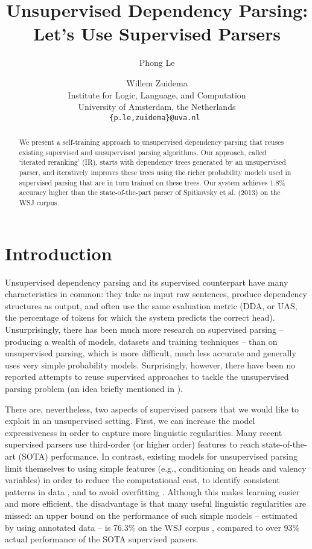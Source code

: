 \documentclass[11pt,letterpaper]{article}
\title{Unsupervised Dependency Parsing: Let's Use Supervised Parsers}
\author{Phong Le \and Willem Zuidema\\
Institute for Logic, Language, and Computation \\
University of Amsterdam, the Netherlands\\
{\tt \{p.le,zuidema\}@uva.nl } \\ }
\begin{document}
\maketitle

\begin{abstract}

  We present a self-training approach to unsupervised dependency parsing that
  reuses existing supervised and unsupervised parsing algorithms. Our
  approach, called `iterated reranking' (IR), starts
  with dependency trees generated by an unsupervised parser, and
  iteratively improves these trees using the richer probability models
  used in supervised parsing that are in turn trained on these trees. 
  Our system achieves 1.8\%
  accuracy higher than the state-of-the-part parser of Spitkovsky et
  al. (2013) on the WSJ corpus.

\end{abstract}


\section{Introduction}

Unsupervised dependency parsing and its supervised counterpart have
many characteristics in common: they take as input raw sentences,
produce dependency structures as output, and often use the same
evaluation metric (DDA, or UAS, the percentage of tokens for which the system
predicts the correct head). Unsurprisingly, there has been much more
research on supervised parsing -- producing a wealth of models,
datasets and training techniques -- than on unsupervised parsing,
which is more difficult, much less accurate and generally uses very
simple probability models.  Surprisingly, however, there have been no
reported attempts to reuse supervised approaches to tackle the
unsupervised parsing problem (an idea briefly mentioned in
).

There are, nevertheless, two aspects of supervised parsers that we would 
like to exploit in an unsupervised setting. First, we can increase the model
expressiveness in order to capture more linguistic regularities. 
Many recent supervised parsers use third-order (or higher order) features
\cite{koo2010efficient,martins2013turning,le2014the} to 
reach state-of-the-art (SOTA) performance. 
In contrast, existing models for unsupervised parsing 
limit themselves to using simple features (e.g., 
conditioning on heads and valency variables) 
in order to reduce the computational cost, to identify 
consistent patterns in data \cite[page 23]{naseem2014linguistically}, 
and to avoid overfitting \cite{blunsom2010unsupervised}. 
Although this makes learning easier and more efficient, 
the disadvantage is that many useful linguistic regularities are
missed: an upper bound on the performance of such simple models -- estimated by using annotated data -- 
is 76.3\% on the WSJ corpus 
\cite{DBLP:conf/emnlp/SpitkovskyAJ13}, compared to over 93\% 
actual performance of the SOTA supervised parsers.
\end{document}
